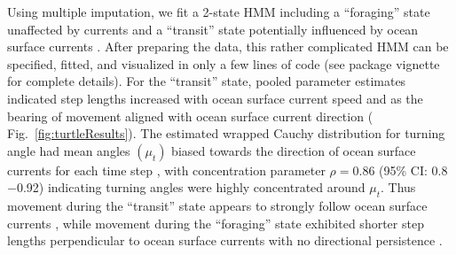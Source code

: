 \documentclass[12pt]{article}\usepackage[]{graphicx}\usepackage[]{color}
\begin{document}
Using multiple imputation, we fit a 2-state HMM including a ``foraging'' state unaffected by currents and a ``transit'' state potentially influenced by ocean surface currents%
. After preparing the data, this rather complicated HMM can be specified, fitted, and visualized in only a few lines of code (see package vignette for complete details). %
For the ``transit'' state, pooled parameter estimates indicated step lengths increased with ocean surface current speed and as the bearing of movement aligned with ocean surface current direction (%
Fig.\ \ref{fig:turtleResults}). The estimated wrapped Cauchy distribution for turning angle had mean angles $(\mu_t)$ 
biased towards the direction of ocean surface currents for each time step%
, with concentration parameter $\rho=0.86$ (95\% CI: 0.8$-$0.92) indicating turning angles were highly concentrated around $\mu_t$. Thus movement during the ``transit'' state appears to strongly follow ocean surface currents%
, while movement during the ``foraging'' state exhibited shorter step lengths %
perpendicular to ocean surface currents %
with no directional persistence%
. %
\end{document}
